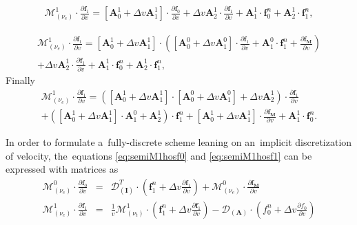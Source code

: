 \documentclass[preprint,12pt]{elsarticle}
\newcommand{\pdv}[2]{\frac{\partial{#1}}{\partial{#2}}}
\newcommand{\vect}[1]{\boldsymbol{#1}}
\newcommand{\matr}[1]{\mathbf{#1}}
\newcommand{\nue}{\nu_{e}}
\newcommand{\nutot}{\nu_{t}}
\newcommand{\vmag}{v}
\newcommand{\tE}{\vect{\tilde{E}}}
\newcommand{\tB}{\vect{\tilde{B}}}
\newcommand{\fM}{f_M}
\newcommand{\fzero}{f_0}
\newcommand{\vfzero}{\vect{f}_0}
\newcommand{\fone}{\vect{f}_1}
\newcommand{\MI}{\matr{I}}
\newcommand{\MA}{\matr{A}}
\newcommand{\IM}{\boldsymbol{\mathcal{M}}}
\newcommand{\ID}{\boldsymbol{\mathcal{D}}}
\newcommand{\IV}{\boldsymbol{\mathcal{V}}}
\newcommand{\IB}{\boldsymbol{\mathcal{B}}}
\begin{document}
\begin{multline}
  \IM^1_{(\nue)} \cdot \pdv{\fone}{\vmag}  
  = \left[\matr{A}^1_0 +
  \Delta\vmag \matr{A}^1_1 \right]\cdot \pdv{\vfzero}{\vmag}
  + \Delta\vmag\matr{A}^1_2\cdot \pdv{\fone}{\vmag}
  +\matr{A}^1_1\cdot \vfzero^n + \matr{A}^1_2\cdot \fone^n ,
  \label{eq:semiM1hosf1}
\end{multline}

\begin{multline}
  \IM^1_{(\nue)} \cdot \pdv{\fone}{\vmag}  
  = \left[\matr{A}^1_0 +
  \Delta\vmag \matr{A}^1_1 \right]\cdot 
  \left( \left[\matr{A}^0_0 + \Delta \vmag \matr{A}^0_1 \right] \cdot 
  \pdv{\fone}{\vmag} 
  + \matr{A}^0_1 \cdot \fone^n + \pdv{\vect{\fM}}{\vmag} \right)\\ 
  + \Delta\vmag\matr{A}^1_2\cdot \pdv{\fone}{\vmag}
  +\matr{A}^1_1\cdot \vfzero^n + \matr{A}^1_2\cdot \fone^n ,
  \label{eq:semiM1hosf1}
\end{multline}
Finally
\begin{multline}
  \IM^1_{(\nue)} \cdot \pdv{\fone}{\vmag}  
  = \left(\left[\matr{A}^1_0 +
  \Delta\vmag \matr{A}^1_1 \right]\cdot 
  \left[\matr{A}^0_0 + \Delta \vmag \matr{A}^0_1 \right] 
  + \Delta\vmag\matr{A}^1_2 \right)
  \cdot \pdv{\fone}{\vmag} \\
  + \left(\left[\matr{A}^1_0 +
  \Delta\vmag \matr{A}^1_1 \right]\cdot\matr{A}^0_1 
  + \matr{A}^1_2 \right)\cdot \fone^n 
  + \left[\matr{A}^1_0 + \Delta\vmag \matr{A}^1_1 \right]\cdot 
  \pdv{\vect{\fM}}{\vmag} 
  +\matr{A}^1_1\cdot \vfzero^n .
  \label{eq:semiM1hosf1}
\end{multline}

In order to formulate a~fully-discrete scheme leaning on an~implicit 
discretization of velocity, the~equations \eqref{eq:semiM1hosf0} and 
\eqref{eq:semiM1hosf1} can be expressed with matrices as
\begin{eqnarray}
  \IM^0_{(\nue)} \cdot \pdv{\vfzero}{\vmag}  
  &=& 
  \ID^T_{\left(\MI\right)} \cdot 
  \left(\fone^n + \Delta \vmag \pdv{\fone}{\vmag}\right)
  + \IM^0_{(\nue)} \cdot \pdv{\vect{\fM}}{\vmag}
  \nonumber\\
  \IM^1_{(\nue)} \cdot \pdv{\fone}{\vmag}  
  &=& 
  \frac{1}{\vmag}\IM^1_{\left( \nutot \right)} 
  \cdot \left(\fone^n + \Delta \vmag \pdv{\fone}{\vmag}\right)
  - \ID_{\left(\MA\right)}\cdot 
  \left(\fzero^n + \Delta \vmag \pdv{\fzero}{\vmag}\right) 
  \nonumber
\end{eqnarray}
\end{document}
